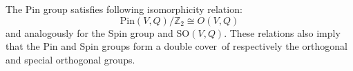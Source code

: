 	\begin{property}
		The Pin group satisfies following isomorphicity relation:
		\begin{equation}
			\text{Pin}(V, Q)/\mathbb{Z}_2 \cong O(V, Q)
		\end{equation}
		and analogously for the Spin group and SO$(V, Q)$. These relations also imply that the Pin and Spin groups form a double cover\footnotemark\ of respectively the orthogonal and special orthogonal groups.
	\end{property}
	
